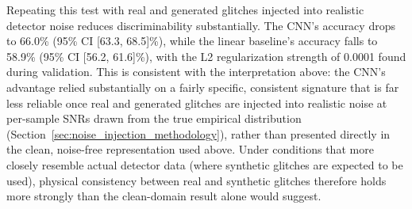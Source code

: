 \documentclass[reprint,nofootinbib,amsmath,amssymb,aps,floatfix]{revtex4-2}
\begin{document}

Repeating this test with real and generated glitches injected into realistic detector noise reduces discriminability substantially. The CNN's accuracy drops to 66.0\% (95\% CI [63.3, 68.5]\%), while the linear baseline's accuracy falls to 58.9\% (95\% CI [56.2, 61.6]\%), with the L2 regularization strength of 0.0001 found during validation. This is consistent with the interpretation above: the CNN's advantage relied substantially on a fairly specific, consistent signature that is far less reliable once real and generated glitches are injected into realistic noise at per-sample SNRs drawn from the true empirical distribution (Section~\ref{sec:noise_injection_methodology}), rather than presented directly in the clean, noise-free representation used above. Under conditions that more closely resemble actual detector data (where synthetic glitches are expected to be used), physical consistency between real and synthetic glitches therefore holds more strongly than the clean-domain result alone would suggest.

\end{document}
